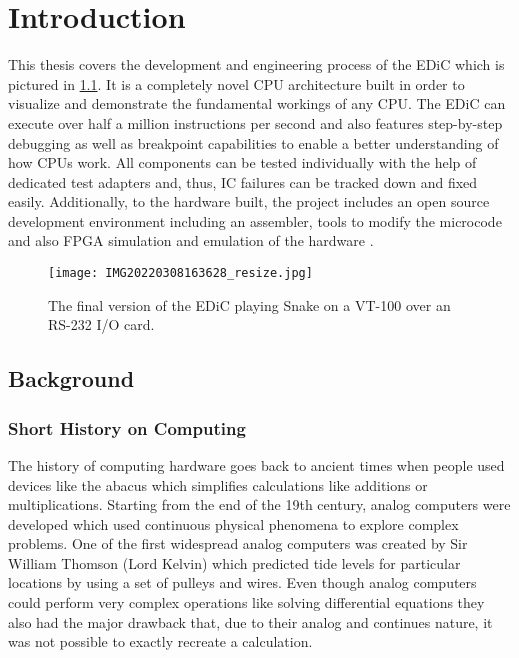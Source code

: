 \chapter{Introduction} \label{cha:intro}
This thesis covers the development and engineering process of the \gls{EDiC} which is pictured in \cref{fig:EDiCSnake}.
It is a completely novel \gls{CPU} architecture built in order to visualize and demonstrate the fundamental workings of any \gls{CPU}.
The \gls{EDiC} can execute over half a million instructions per second and also features step-by-step debugging as well as breakpoint capabilities to enable a better understanding of how \glspl{CPU} work.
All components can be tested individually with the help of dedicated test adapters and, thus, \gls{IC} failures can be tracked down and fixed easily.
Additionally, to the hardware built, the project includes an open source development environment including an assembler, tools to modify the microcode and also \gls{FPGA} simulation and emulation of the hardware \cite{EDiCGitHub}.
\begin{figure}[t]
  \centering
  \texttt{[image: IMG20220308163628\_resize.jpg]}
  \caption{The final version of the \gls{EDiC} playing Snake on a VT-100 over an RS-232 I/O card.}
  \label{fig:EDiCSnake}
\end{figure}
\section{Background}
\subsection{Short History on Computing}
The history of computing hardware goes back to ancient times when people used devices like the abacus which simplifies calculations like additions or multiplications.
Starting from the end of the 19th century, analog computers were developed which used continuous physical phenomena to explore complex problems.
One of the first widespread analog computers was created by Sir William Thomson (Lord Kelvin) which predicted tide levels for particular locations by using a set of pulleys and wires. \cite{sep-computing-history}
Even though analog computers could perform very complex operations like solving differential equations \cite{analogDiff} they also had the major drawback that, due to their analog and continues nature, it was not possible to exactly recreate a calculation.

